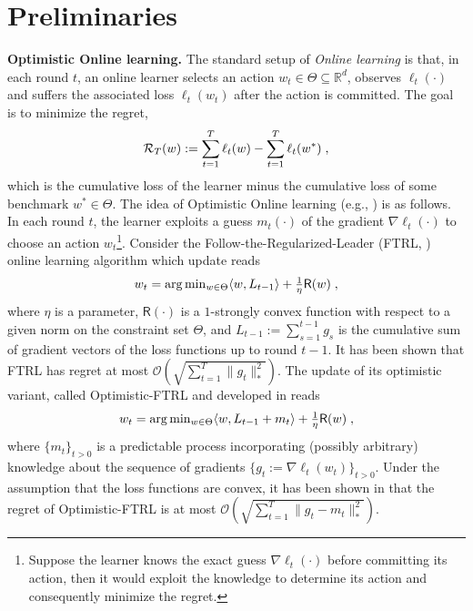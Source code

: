 \documentclass[wcp]{jmlr}
\begin{document}
\section{Preliminaries}\label{sec:prelim}
\vspace{-0.05in}

\textbf{Optimistic Online learning.}\hspace{0.1cm}
The standard setup of \emph{Online learning} is that, in each round $t$, an online learner selects an action $w_{t} \in \Theta \subseteq \mathbb R^{d}$, observes $\ell_{t}(\cdot)$ and suffers the associated loss $\ell_{t}(w_t)$ after the action is committed.
The goal is to minimize the regret, 
$$\mathcal{R}_{T}( w  ):= \sum_{t=1}^T \ell_{t}(w) - \sum_{t=1}^T \ell_{t}(w^*)\eqsp,$$
which is the cumulative loss of the learner minus the cumulative loss of some benchmark $w^{*} \in \Theta$.
The idea of Optimistic Online learning (e.g., \citep{CJ12,RS13b,SALS15,ALLW18}) is as follows.
In each round $t$, the learner exploits a guess $m_t(\cdot)$ of the gradient $\nabla \ell_t(\cdot)$ to choose an action $w_t$\footnote{Suppose the learner knows the exact guess $\nabla \ell_t(\cdot)$ before committing its action, then it would exploit the knowledge to determine its action and consequently minimize the regret.}. 
Consider the Follow-the-Regularized-Leader (FTRL, \citep{H14}) online learning algorithm which update reads
\begin{equation} \notag
\textstyle w_t  = \arg \min_{w \in \Theta} \langle w , L_{t-1} \rangle + \frac{1}{\eta} \textsf{R}(w) \eqsp,
\end{equation}
where $\eta$ is a parameter, $\textsf{R}(\cdot)$ is a $1$-strongly convex function with respect to a given norm on the constraint set $\Theta$, and $L_{t-1}:= \sum_{s=1}^{t-1} g_s$ is the cumulative sum of gradient vectors of the loss functions up to round $t-1$. It has been shown that FTRL has regret at most $\mathcal{O}(\sqrt{\sum_{t=1}^T \| g_t \|_*^2})$.
The update of its optimistic variant, called Optimistic-FTRL and developed in \citep{SALS15} reads
\begin{equation} \label{optFTRL}
\textstyle w_t  = \arg \min_{w \in \Theta} \langle w , L_{t-1} + m_t \rangle + \frac{1}{\eta} \textsf{R}(w)\eqsp,
\end{equation}
where $\{m_{t}\}_{t>0}$ is a predictable process incorporating (possibly arbitrary) knowledge about the sequence of gradients $\{ g_{t}:=\nabla \ell_t(w_t)\}_{t>0}$.
Under the assumption that the loss functions are convex, it has been shown in \citep{SALS15} that the regret of Optimistic-FTRL is at most $\mathcal{O}(\sqrt{\sum_{t=1}^T \| g_t - m_t \|_*^2 } )$.
\end{document}
